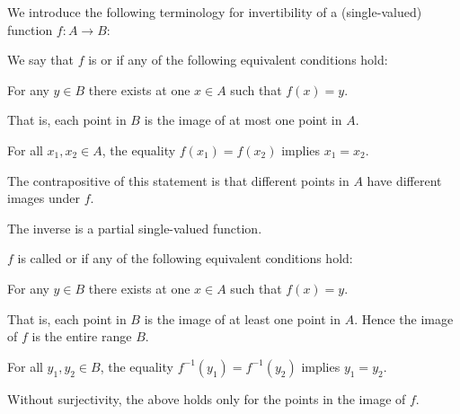 \begin{definition}\label{def:function_invertibility}
  We introduce the following terminology for invertibility of a (single-valued) function \( f: A \to B \):
  \begin{thmenum}
    \begin{minipage}[t]{0.43\textwidth}
       We say that \( f \) is  or  if any of the following equivalent conditions hold:
      \begin{thmenum}
         For any \( y \in B \) there exists at  one \( x \in A \) such that \( f(x) = y \).

        That is, each point in \( B \) is the image of at most one point in \( A \).
        \newline

         For all \( x_1, x_2 \in A \), the equality \( f(x_1) = f(x_2) \) implies \( x_1 = x_2 \).

        The contrapositive of this statement is that different points in \( A \) have different images under \( f \).

         The inverse is a partial single-valued function.
      \end{thmenum}
    \end{minipage}
    \hfill
    \begin{minipage}[t]{0.44\textwidth}
       \( f \) is called  or  if any of the following equivalent conditions hold:
      \newline
      \begin{thmenum}[leftmargin=0.9cm]
         For any \( y \in B \) there exists at  one \( x \in A \) such that \( f(x) = y \).

        That is, each point in \( B \) is the image of at least one point in \( A \). Hence the image of \( f \) is the entire range \( B \).

         For all \( y_1, y_2 \in B \), the equality \( f^{-1}(y_1) = f^{-1}(y_2) \) implies \( y_1 = y_2 \).

        Without surjectivity, the above holds only for the points in the image of \( f \).


\end{thmenum}
\end{minipage}
\end{thmenum}
\end{definition}
